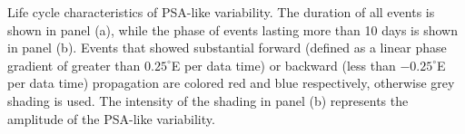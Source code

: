 \label{fig:lifecycle}
Life cycle characteristics of PSA-like variability. The duration of all events is shown in panel (a), while the phase of events lasting more than 10 days is shown in panel (b). Events that showed substantial forward (defined as a linear phase gradient of greater than $0.25^{\circ}$E per data time) or backward (less than $-0.25^{\circ}$E per data time) propagation are colored red and blue respectively, otherwise grey shading is used. The intensity of the shading in panel (b) represents the amplitude of the PSA-like variability.
